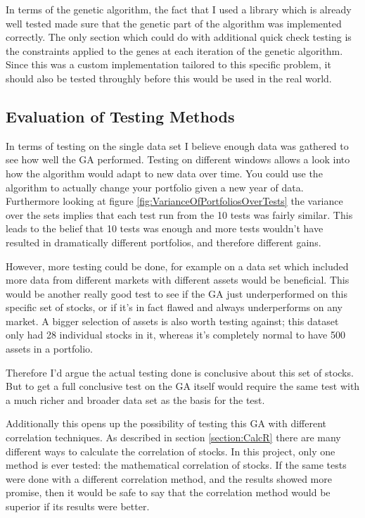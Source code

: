 \documentclass[11pt]{article}
\begin{document}
    In terms of the genetic algorithm, the fact that I used a library \cite{Moo}
    which is already well tested made sure that the genetic part of the algorithm
    was implemented correctly. The only section which could do with additional
    quick check testing is the constraints applied to the genes at each iteration
    of the genetic algorithm. Since this was a custom implementation tailored to
    this specific problem, it should also be tested throughly before this
    would be used in the real world.

\subsection{Evaluation of Testing Methods}

    In terms of testing on the single data set \cite{Dataset} I believe enough
    data was gathered to see how well the GA performed. Testing on different
    windows allows a look into how the algorithm would adapt to new data over time.
    You could use the algorithm to actually change your portfolio given a
    new year of data. Furthermore looking at figure \ref{fig:VarianceOfPortfoliosOverTests}
    the variance over the sets implies that each test run from the 10 tests was
    fairly similar. This leads to the belief that 10 tests was enough and more tests
    wouldn't have resulted in dramatically different portfolios, and therefore
    different gains.

    However, more testing could be done, for example on a data set which included more data from
    different markets with different assets would be beneficial. This would be another really good test
    to see if the GA just underperformed on this specific set of stocks, or if it's
    in fact flawed and always underperforms on any market. A bigger selection
    of assets is also worth testing against; this dataset only had 28 individual
    stocks in it, whereas it's completely normal to have 500 assets in a portfolio.

    Therefore I'd argue the actual testing done is conclusive about this set
    of stocks. But to get a full conclusive test on the GA itself would
    require the same test with a much richer and broader data set as
    the basis for the test.

    Additionally this opens up the possibility of testing this GA with different
    correlation techniques. As described in section \ref{section:CalcR} there
    are many different ways to calculate the correlation of stocks. In this project,
    only one method is ever tested: the mathematical correlation of stocks. If the
    same tests were done with a different correlation method, and the results
    showed more promise, then it would be safe to say that the correlation
    method would be superior if its results were better.
\end{document}
